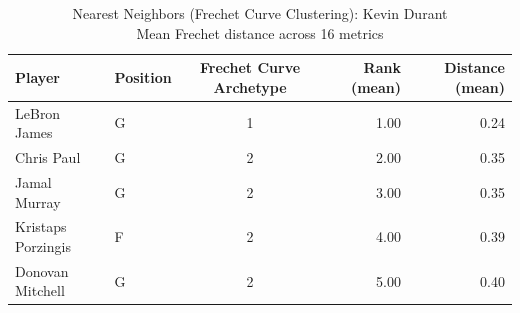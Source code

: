 \begin{table}[t]
\caption*{
{\fontsize{20}{25} Nearest Neighbors (Frechet Curve Clustering): Kevin Durant\fontsize{12}{15}\selectfont } \\ 
{\fontsize{14}{17}\selectfont  Mean Frechet distance across 16 metrics\fontsize{12}{15}\selectfont }
} 
\fontsize{12.0pt}{14.0pt}\selectfont
\begin{tabular*}{\linewidth}{@{\extracolsep{\fill}}llcrr}
\toprule
Player & Position & Frechet Curve Archetype & Rank (mean) & Distance (mean) \\ 
\midrule\addlinespace[2.5pt]
LeBron James & G & 1 & 1.00 & 0.24 \\ 
Chris Paul & G & 2 & 2.00 & 0.35 \\ 
Jamal Murray & G & 2 & 3.00 & 0.35 \\ 
Kristaps Porzingis & F & 2 & 4.00 & 0.39 \\ 
Donovan Mitchell & G & 2 & 5.00 & 0.40 \\ 
\bottomrule
\end{tabular*}
\end{table}


